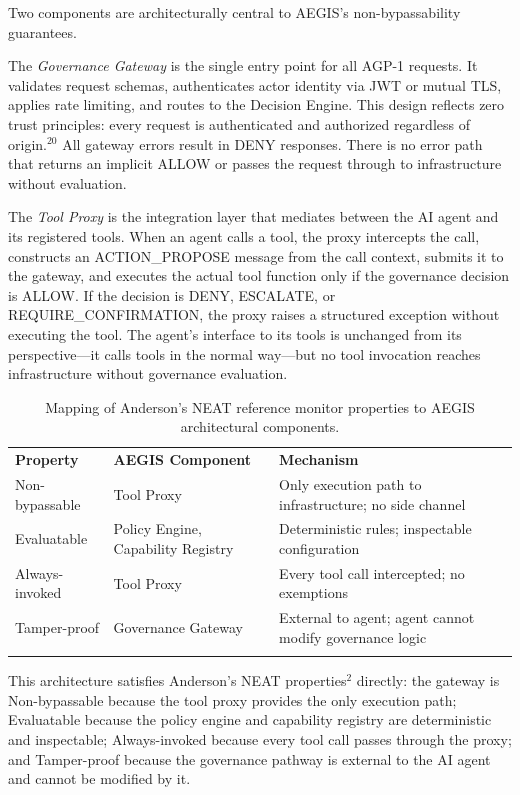 \documentclass{IEEEcsmag}
\begin{document}
Two components are architecturally central to AEGIS's non-bypassability guarantees.

The {\it Governance Gateway} is the single entry point for all AGP-1 requests. It validates request schemas, authenticates actor identity via JWT or mutual TLS, applies rate limiting, and routes to the Decision Engine. This design reflects zero trust principles: every request is authenticated and authorized regardless of origin.$^{20}$ All gateway errors result in DENY responses. There is no error path that returns an implicit ALLOW or passes the request through to infrastructure without evaluation.

The {\it Tool Proxy} is the integration layer that mediates between the AI agent and its registered tools. When an agent calls a tool, the proxy intercepts the call, constructs an ACTION\_PROPOSE message from the call context, submits it to the gateway, and executes the actual tool function only if the governance decision is ALLOW. If the decision is DENY, ESCALATE, or REQUIRE\_CONFIRMATION, the proxy raises a structured exception without executing the tool. The agent's interface to its tools is unchanged from its perspective---it calls tools in the normal way---but no tool invocation reaches infrastructure without governance evaluation.

\begin{table}[!t]
\centering
\caption{Mapping of Anderson's NEAT reference monitor properties to AEGIS architectural components.}
\label{tab:neat}
\tablefont
\begin{tabular*}{21pc}{@{}p{52pt}<{\raggedright}p{65pt}<{\raggedright}p{90pt}<{\raggedright}@{}}
\toprule
{\bf Property} & {\bf AEGIS Component} & {\bf Mechanism} \\
\colrule
Non-bypassable & Tool Proxy & Only execution path to infrastructure; no side channel \\[3pt]
Evaluatable & Policy Engine, Capability Registry & Deterministic rules; inspectable configuration \\[3pt]
Always-invoked & Tool Proxy & Every tool call intercepted; no exemptions \\[3pt]
Tamper-proof & Governance Gateway & External to agent; agent cannot modify governance logic \\
\botrule
\end{tabular*}
\end{table}

This architecture satisfies Anderson's NEAT properties$^{2}$ directly: the gateway is Non-bypassable because the tool proxy provides the only execution path; Evaluatable because the policy engine and capability registry are deterministic and inspectable; Always-invoked because every tool call passes through the proxy; and Tamper-proof because the governance pathway is external to the AI agent and cannot be modified by it.
\end{document}
